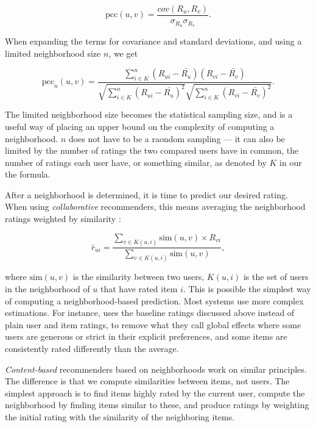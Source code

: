 \begin{equation*}
  \mathrm{pcc}(u,v) = \frac{cov(R_u, R_v)}{\sigma_{R_u} \sigma_{R_v}}.
\end{equation*}

When expanding the terms for covariance and standard deviations, 
and using a limited neighborhood size $n$, we get

\begin{equation*}
  \mathrm{pcc}_{n}(u,v) = 
    \frac{
      \sum_{i \in K}^{n} (R_{ui} - \bar{R_u}) (R_{vi} - \bar{R_v}) }{ 
        \sqrt{ \sum_{i \in K}^{n} (R_{ui} - \bar{R_u})^2 } 
        \sqrt{ \sum_{i \in K}^{n} (R_{vi} - \bar{R_v})^2 }}.
\end{equation*}

The limited neighborhood size becomes the statistical sampling size, and is a useful
way of placing an upper bound on the complexity of computing a neighborhood.
$n$ does not have to be a raondom sampling --- it can also be limited by the number of ratings 
the two compared users have in common, the number of ratings each user have, or something similar,
as denoted by $K$ in our the formula.

After a neighborhood is determined, it is time to predict our desired rating.
When using \emph{collaborative} recommenders, this means averaging the neighborhood ratings weighted by similarity \cite[p16]{Segaran2007}:

\begin{equation*}
  \bar{r}_{ui} = \frac{ \sum_{v \in K(u,i)} \mathrm{sim}(u,v) \times R_{vi} }{ \sum_{v \in K(u,i)} \mathrm{sim}(u,v) },
\end{equation*}

where $\mathrm{sim}(u,v)$ is the similarity between two users, $K(u,i)$ is the set of users in the neighborhood of $u$ that have rated item $i$.
This is possible the simplest way of computing a neighborhood-based prediction.
Most systems use more complex estimations. For instance, \cite{Koren2008} 
uses the baseline ratings discussed above instead of plain user and item ratings, to
remove what they call global effects where some users are generous or strict in their 
explicit preferences, and some items are consistently rated differently than the average.

\emph{Content-based} recommenders based on neighborhoods work on similar principles.
The difference is that we compute similarities between items, not users. The simplest
approach is to find items highly rated by the current user, compute the neighborhood 
by finding items similar to these, and produce ratings by weighting the initial rating
with the similarity of the neighboring items.

